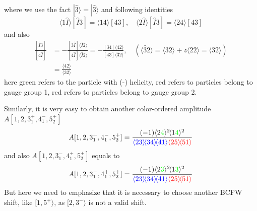 \documentclass[12pt]{article}
\newcommand{\mdavg}[2]{\langle #1 \rangle\!\langle #2 \rangle}
\newcommand{\avg}[1]{\langle #1 \rangle}
\newcommand{\inavg}[2]{\langle #1 \rangle\! [#2]}
\newcommand{\rinavg}[2]{[#1]\!\langle #2 \rangle}
\begin{document}
where we use the fact $|\hat{3}\rangle=|\hat{3}\rangle$ and following identities
\begin{equation*}
    \inavg{1\hat{I}}{\hat{I}3}=\inavg{14}{43},\quad \inavg{2\hat{I}}{\hat{I}3}=\inavg{24}{43}
\end{equation*}
and also
\begin{align*}
    \frac{[\hat{I}3]}{[4\hat{I}]}&=-\frac{\rinavg{3\hat{I}}{\hat{I}2}}{\rinavg{4\hat{I}}{\hat{I}2}}=-\frac{\rinavg{34}{42}}{\rinavg{43}{\hat{3}2}},\quad(\avg{\hat{3}2}=\avg{32}+z\avg{22}=\avg{32})\\
    &=\frac{\avg{42}}{\avg{32}}
\end{align*}
here green refers to the particle with (-) helicity, red refers to particles belong to gauge group 1, red refers to particles belong to gauge group 2.
\par
Similarly, it is very easy to obtain another color-ordered amplitude $A[1,2,3_1^+,4_1^-,5_2^+]$
\begin{align*}
    A[1,2,3_1^+,4_1^-,5_2^+]=
    \frac{(-1)\avg{2\textcolor{green}{4}}^2\!\avg{1\textcolor{green}{4}}^2}{\textcolor{blue}{\mdavg{23}{34}\!\avg{41}}\textcolor{red}{\mdavg{25}{51}}}
\end{align*}
and also $A[1,2,3_1^-,4_1^+,5_2^+]$ equals to
\begin{equation*}
    A[1,2,3_1^-,4_1^+,5_2^+]=
    \frac{(-1)\avg{2\textcolor{green}{3}}^2\!\avg{1\textcolor{green}{3}}^2}{\textcolor{blue}{\mdavg{23}{34}\!\avg{41}}\textcolor{red}{\mdavg{25}{51}}}
\end{equation*}
But here we need to emphasize that it is necessary to choose another BCFW shift, like $[1,5^+ \rangle$, as $[2,3^- \rangle$ is not a valid shift. 
\end{document}
